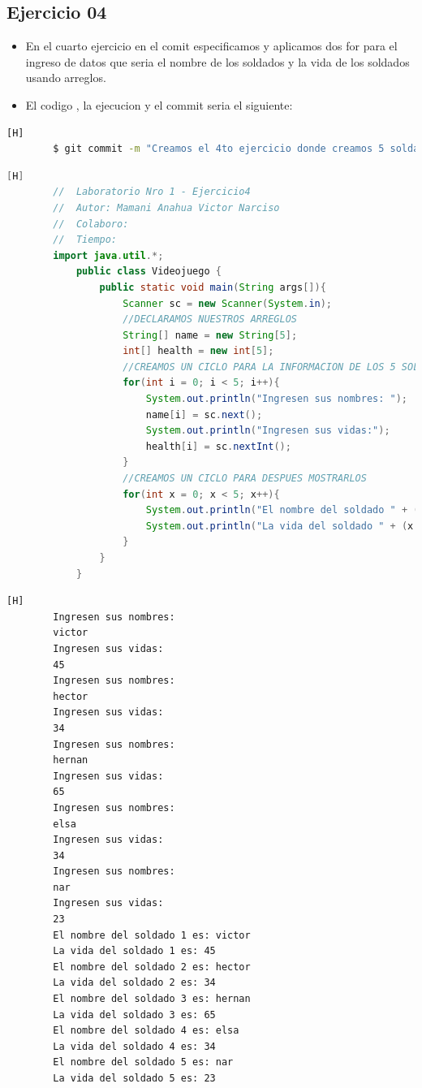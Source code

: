 \documentclass{article}
\begin{document}
	\subsection{Ejercicio 04}
	\begin{itemize}	
		\item En el cuarto ejercicio en el comit especificamos y aplicamos dos for para el ingreso de datos que seria el nombre de los soldados y la vida de los soldados usando arreglos.
		\item El codigo , la ejecucion y el commit seria el siguiente:
	\end{itemize}
	\begin{lstlisting}[language=bash,caption={Commit}][H]
		$ git commit -m "Creamos el 4to ejercicio donde creamos 5 soldados y imprimimos sus nombres y su vida usando arreglos"
	\end{lstlisting}
	\begin{lstlisting}[language=java,caption={Las lineas de codigo del Ejercicio04 serian}][H]
		//  Laboratorio Nro 1 - Ejercicio4
		//  Autor: Mamani Anahua Victor Narciso
		//  Colaboro:
		//  Tiempo: 
		import java.util.*;
			public class Videojuego {
				public static void main(String args[]){
					Scanner sc = new Scanner(System.in);
					//DECLARAMOS NUESTROS ARREGLOS
					String[] name = new String[5];
					int[] health = new int[5];
					//CREAMOS UN CICLO PARA LA INFORMACION DE LOS 5 SOLDADOS
					for(int i = 0; i < 5; i++){
						System.out.println("Ingresen sus nombres: ");
						name[i] = sc.next();
						System.out.println("Ingresen sus vidas:");
						health[i] = sc.nextInt();
					}
					//CREAMOS UN CICLO PARA DESPUES MOSTRARLOS
					for(int x = 0; x < 5; x++){
						System.out.println("El nombre del soldado " + (x + 1) + " es: " + name[x]);
						System.out.println("La vida del soldado " + (x + 1) + " es: " + health[x]);
					}
				}
			}
	\end{lstlisting}
	\begin{lstlisting}[language=bash,caption={La ejecucion dada:}][H]
		Ingresen sus nombres: 
		victor
		Ingresen sus vidas:
		45
		Ingresen sus nombres: 
		hector
		Ingresen sus vidas:
		34
		Ingresen sus nombres: 
		hernan
		Ingresen sus vidas:
		65
		Ingresen sus nombres: 
		elsa
		Ingresen sus vidas:
		34
		Ingresen sus nombres: 
		nar
		Ingresen sus vidas:
		23
		El nombre del soldado 1 es: victor
		La vida del soldado 1 es: 45
		El nombre del soldado 2 es: hector
		La vida del soldado 2 es: 34
		El nombre del soldado 3 es: hernan
		La vida del soldado 3 es: 65
		El nombre del soldado 4 es: elsa
		La vida del soldado 4 es: 34
		El nombre del soldado 5 es: nar
		La vida del soldado 5 es: 23
	\end{lstlisting}
\end{document}
